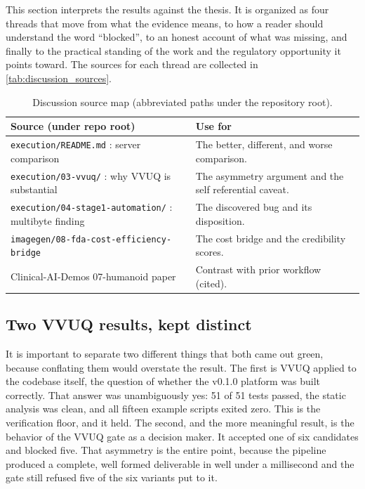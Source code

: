 
This section interprets the results against the thesis. It is organized as four
threads that move from what the evidence means, to how a reader should
understand the word ``blocked'', to an honest account of what was missing, and
finally to the practical standing of the work and the regulatory opportunity it
points toward. The sources for each thread are collected in
\autoref{tab:discussion_sources}.

\begin{table}[H]
\caption{Discussion source map (abbreviated paths under the repository root).}
\label{tab:discussion_sources}
\centering
\begin{tabularx}{\textwidth}{L{7.8cm} >{\raggedright\arraybackslash}X}
\toprule
\textbf{Source (under repo root)} & \textbf{Use for} \\
\midrule
  \texttt{execution/README.md} : server comparison & The better, different, and worse comparison. \\
  \texttt{execution/03-vvuq/} : why VVUQ is substantial & The asymmetry argument and the self referential caveat. \\
  \texttt{execution/04-stage1-automation/} : multibyte finding & The discovered bug and its disposition. \\
  \texttt{imagegen/08-fda-cost-efficiency-bridge} & The cost bridge and the credibility scores. \\
  Clinical-AI-Demos 07-humanoid paper & Contrast with prior workflow (cited). \\
\bottomrule
\end{tabularx}
\end{table}

\subsection{Two VVUQ results, kept distinct}

It is important to separate two different things that both came out green, because
conflating them would overstate the result. The first is VVUQ applied to the
codebase itself, the question of whether the v0.1.0 platform was built correctly.
That answer was unambiguously yes: 51 of 51 tests passed, the static analysis was
clean, and all fifteen example scripts exited zero. This is the verification
floor, and it held. The second, and the more meaningful result, is the behavior
of the VVUQ gate as a decision maker. It accepted one of six candidates and
blocked five. That asymmetry is the entire point, because the pipeline produced a
complete, well formed deliverable in well under a millisecond and the gate still
refused five of the six variants put to it. 

